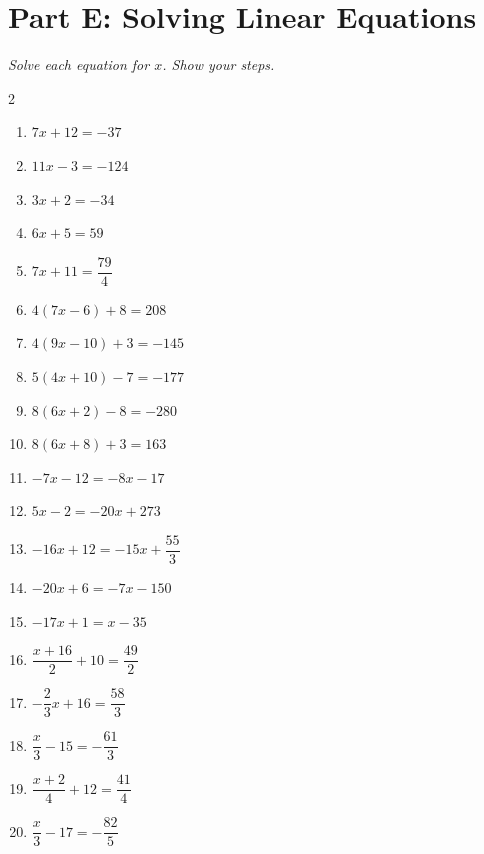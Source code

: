 \documentclass[11pt]{article}
\begin{document}
\section*{Part E: Solving Linear Equations}
\noindent\textit{Solve each equation for $x$. Show your steps.}
\begin{multicols}{2}
\begin{enumerate}
  \item $7x + 12 = -37$
  \vspace{2.0cm}
  \item $11x - 3 = -124$
  \vspace{2.0cm}
  \item $3x + 2 = -34$
  \vspace{2.0cm}
  \item $6x + 5 = 59$
  \vspace{2.0cm}
  \item $7x + 11 = \dfrac{79}{4}$
  \vspace{2.0cm}
  \item $4(7x - 6) + 8 = 208$
  \vspace{2.0cm}
  \item $4(9x - 10) + 3 = -145$
  \vspace{2.0cm}
  \item $5(4x + 10) - 7 = -177$
  \vspace{2.0cm}
  \item $8(6x + 2) - 8 = -280$
  \vspace{2.0cm}
  \item $8(6x + 8) + 3 = 163$
  \vspace{2.0cm}
  \item $-7x - 12 = -8x - 17$
  \vspace{2.0cm}
  \item $5x - 2 = -20x + 273$
  \vspace{2.0cm}
  \item $-16x + 12 = -15x + \dfrac{55}{3}$
  \vspace{2.0cm}
  \item $-20x + 6 = -7x - 150$
  \vspace{2.0cm}
  \item $-17x + 1 = x - 35$
  \vspace{2.0cm}
  \item $\dfrac{x + 16}{2} + 10 = \dfrac{49}{2}$
  \vspace{2.0cm}
  \item $-\dfrac{2}{3}x + 16 = \dfrac{58}{3}$
  \vspace{2.0cm}
  \item $\dfrac{x}{3} - 15 = -\dfrac{61}{3}$
  \vspace{2.0cm}
  \item $\dfrac{x + 2}{4} + 12 = \dfrac{41}{4}$
  \vspace{2.0cm}
  \item $\dfrac{x}{3} - 17 = -\dfrac{82}{5}$
  \vspace{2.0cm}
\end{enumerate}
\end{multicols}
\end{document}
